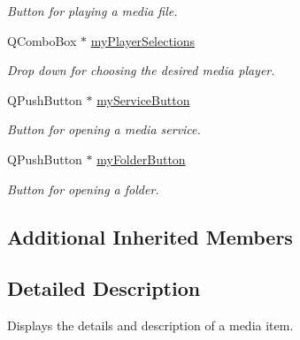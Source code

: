 \begin{DoxyCompactItemize}
\begin{DoxyCompactList}\small\item\em Button for playing a media file. \end{DoxyCompactList}\item 
\hypertarget{class_u_i_1_1_info_pane_aeba75d3a7d7dbfc0d0f70dda70dc3d7f}{Q\-Combo\-Box $\ast$ \hyperlink{class_u_i_1_1_info_pane_aeba75d3a7d7dbfc0d0f70dda70dc3d7f}{my\-Player\-Selections}}\label{class_u_i_1_1_info_pane_aeba75d3a7d7dbfc0d0f70dda70dc3d7f}

\begin{DoxyCompactList}\small\item\em Drop down for choosing the desired media player. \end{DoxyCompactList}\item 
\hypertarget{class_u_i_1_1_info_pane_a63aa13b93b1930ac6b1e66d7803aa407}{Q\-Push\-Button $\ast$ \hyperlink{class_u_i_1_1_info_pane_a63aa13b93b1930ac6b1e66d7803aa407}{my\-Service\-Button}}\label{class_u_i_1_1_info_pane_a63aa13b93b1930ac6b1e66d7803aa407}

\begin{DoxyCompactList}\small\item\em Button for opening a media service. \end{DoxyCompactList}\item 
\hypertarget{class_u_i_1_1_info_pane_a6598a9de124048d70d1851c919514bee}{Q\-Push\-Button $\ast$ \hyperlink{class_u_i_1_1_info_pane_a6598a9de124048d70d1851c919514bee}{my\-Folder\-Button}}\label{class_u_i_1_1_info_pane_a6598a9de124048d70d1851c919514bee}

\begin{DoxyCompactList}\small\item\em Button for opening a folder. \end{DoxyCompactList}\end{DoxyCompactItemize}
\subsection*{Additional Inherited Members}


\subsection{Detailed Description}
Displays the details and description of a media item. 

